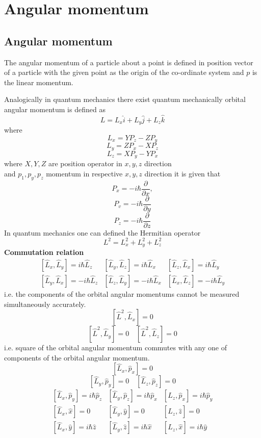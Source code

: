 \chapter{Angular momentum}
\section{Angular momentum }
The angular momentum of a particle about a point is defined in position vector of a particle with the given point as the origin of the co-ordinate system and $p$ is the linear momentum.

Analogically in quantum mechanics there exist quantum mechanically orbital angular momentum is defined as
$$
L=L_{x} \hat{i}+L_{y} \hat{j}+L_{z} \hat{k}
$$
where
 $$L_{x}=Y P_{z}-Z P_{y}$$
$$ L_{y}=Z P_{x}-X P_{z}$$
 $$L_{z}=X P_{y}-Y P_{x}$$
where $X, Y, Z$ are position operator in $x, y, z$ direction \\
and $p_{1}, p_{y}, p_{z}$ momentum in respective
$x, y, z$ direction it is given that \\
$$P_{x}=-i \hbar \frac{\partial}{\partial x},$$
$$ P_{v}=-i \hbar \frac{\partial}{\partial y}$$
 $$P_{z}=-i \hbar \frac{\partial}{\partial z}$$
In quantum mechanics one can defined the Hermitian operator
$$
L^{2}=L_{x}^{2}+L_{y}^{2}+L_{z}^{2}
$$
\textbf{Commutation relation}
$$
\begin{array}{lll}
{\left[\hat{L}_{x}, \hat{L}_{y}\right]=i \hbar \hat{L}_{z}} & {\left[\hat{L}_{y}, \hat{L}_{z}\right]=i \hbar \hat{L}_{x}} & {\left[\hat{L}_{z}, \hat{L}_{x}\right]=i \hbar \hat{L}_{y}} \\
{\left[\hat{L}_{y}, \hat{L}_{x}\right]=-i \hbar \hat{L}_{z}} & {\left[\hat{L}_{z}, \hat{L}_{y}\right]=-i \hbar \hat{L}_{x}} & {\left[\hat{L}_{x}, \hat{L}_{z}\right]=-i \hbar \hat{L}_{y}}
\end{array}
$$
i.e. the components of the orbital angular momentums cannot be measured simultaneously accurately.
$$
\left[\hat{L}^{2}, \hat{L}_{x}\right]=0
$$
$$
\left[\hat{L}^{2}, \hat{L}_{y}\right]=0 \quad\left[\hat{L}^{2}, \hat{L}_{z}\right]=0
$$
i.e. square of the orbital angular momentum commutes with any one of components of the orbital angular momentum.
$$
\left[\hat{L}_{x}, \hat{p}_{x}\right]=0
$$
$$
\left[\hat{L}_{y}, \hat{p}_{y}\right]=0 \quad\left[\hat{L}_{z}, \hat{p}_{z}\right]=0
$$
$$\begin{array}{lll}
	{\left[\hat{L}_{x}, \hat{p}_{y}\right]=i \hbar \hat{p}_{z}} & {\left[\hat{L}_{y}, \hat{p}_{z}\right]=i \hbar \hat{p}_{x}} & {\left[\hat{L}_{z}, \hat{p}_{x}\right]=i \hbar \hat{p}_{y}} \\
	{\left[\hat{L}_{x}, \hat{x}\right]=0} & {\left[\hat{L}_{y}, \hat{y}\right]=0} & {\left[\hat{L}_{z}, \hat{z}\right]=0} \\
	{\left[\hat{L}_{x}, \hat{y}\right]=i \hbar \hat{z}} & {\left[\hat{L}_{y}, \hat{z}\right]=i \hbar \hat{x}} & {\left[\hat{L}_{z}, \hat{x}\right]=i \hbar \hat{y}}
\end{array}$$
